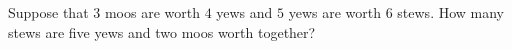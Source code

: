 Suppose that $3$ moos are worth $4$ yews and $5$ yews are worth $6$ stews. How many stews are five yews and two moos worth together?
